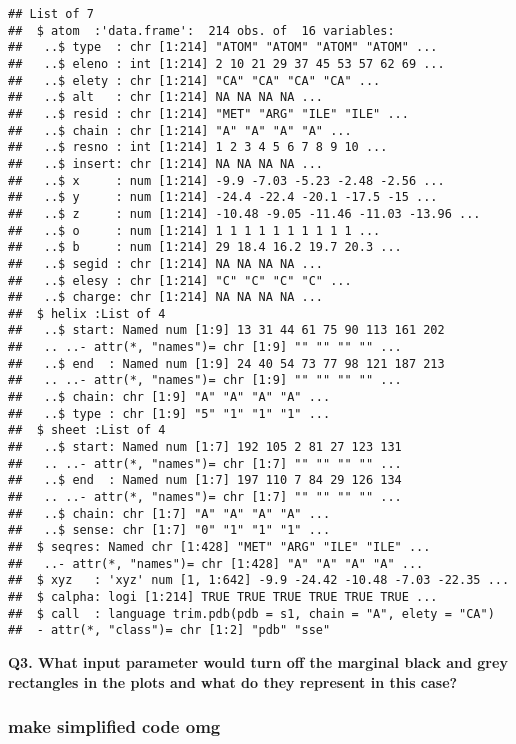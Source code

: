 \documentclass[]{article}
\begin{document}
\begin{verbatim}
## List of 7
##  $ atom  :'data.frame':  214 obs. of  16 variables:
##   ..$ type  : chr [1:214] "ATOM" "ATOM" "ATOM" "ATOM" ...
##   ..$ eleno : int [1:214] 2 10 21 29 37 45 53 57 62 69 ...
##   ..$ elety : chr [1:214] "CA" "CA" "CA" "CA" ...
##   ..$ alt   : chr [1:214] NA NA NA NA ...
##   ..$ resid : chr [1:214] "MET" "ARG" "ILE" "ILE" ...
##   ..$ chain : chr [1:214] "A" "A" "A" "A" ...
##   ..$ resno : int [1:214] 1 2 3 4 5 6 7 8 9 10 ...
##   ..$ insert: chr [1:214] NA NA NA NA ...
##   ..$ x     : num [1:214] -9.9 -7.03 -5.23 -2.48 -2.56 ...
##   ..$ y     : num [1:214] -24.4 -22.4 -20.1 -17.5 -15 ...
##   ..$ z     : num [1:214] -10.48 -9.05 -11.46 -11.03 -13.96 ...
##   ..$ o     : num [1:214] 1 1 1 1 1 1 1 1 1 1 ...
##   ..$ b     : num [1:214] 29 18.4 16.2 19.7 20.3 ...
##   ..$ segid : chr [1:214] NA NA NA NA ...
##   ..$ elesy : chr [1:214] "C" "C" "C" "C" ...
##   ..$ charge: chr [1:214] NA NA NA NA ...
##  $ helix :List of 4
##   ..$ start: Named num [1:9] 13 31 44 61 75 90 113 161 202
##   .. ..- attr(*, "names")= chr [1:9] "" "" "" "" ...
##   ..$ end  : Named num [1:9] 24 40 54 73 77 98 121 187 213
##   .. ..- attr(*, "names")= chr [1:9] "" "" "" "" ...
##   ..$ chain: chr [1:9] "A" "A" "A" "A" ...
##   ..$ type : chr [1:9] "5" "1" "1" "1" ...
##  $ sheet :List of 4
##   ..$ start: Named num [1:7] 192 105 2 81 27 123 131
##   .. ..- attr(*, "names")= chr [1:7] "" "" "" "" ...
##   ..$ end  : Named num [1:7] 197 110 7 84 29 126 134
##   .. ..- attr(*, "names")= chr [1:7] "" "" "" "" ...
##   ..$ chain: chr [1:7] "A" "A" "A" "A" ...
##   ..$ sense: chr [1:7] "0" "1" "1" "1" ...
##  $ seqres: Named chr [1:428] "MET" "ARG" "ILE" "ILE" ...
##   ..- attr(*, "names")= chr [1:428] "A" "A" "A" "A" ...
##  $ xyz   : 'xyz' num [1, 1:642] -9.9 -24.42 -10.48 -7.03 -22.35 ...
##  $ calpha: logi [1:214] TRUE TRUE TRUE TRUE TRUE TRUE ...
##  $ call  : language trim.pdb(pdb = s1, chain = "A", elety = "CA")
##  - attr(*, "class")= chr [1:2] "pdb" "sse"
\end{verbatim}

\textbf{Q3. What input parameter would turn off the marginal black and
grey rectangles in the plots and what do they represent in this case?}

\hypertarget{make-simplified-code-omg}{%
\subsubsection{make simplified code
omg}\label{make-simplified-code-omg}}
\end{document}

